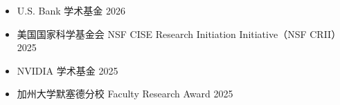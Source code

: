 \begin{itemize}
  \item U.S. Bank 学术基金 \hfill 2026
  \item 美国国家科学基金会 NSF CISE Research Initiation Initiative（NSF CRII） \hfill 2025
  \item NVIDIA 学术基金 \hfill 2025
  \item 加州大学默塞德分校 Faculty Research Award \hfill 2025
\end{itemize}
